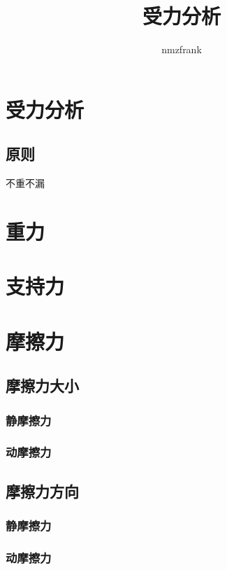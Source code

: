 \documentclass[UTF8]{article}
\begin{document}
\title{受力分析}
\author{nmzfrank}
\maketitle
\section{受力分析}
\subsection{原则} 不重不漏
\section{重力}
\section{}
\section{支持力}
\section{摩擦力}
\subsection{摩擦力大小}
\subsubsection{静摩擦力}
\subsubsection{动摩擦力}
\subsection{摩擦力方向}
\subsubsection{静摩擦力}
\subsubsection{动摩擦力}
\end{document}
